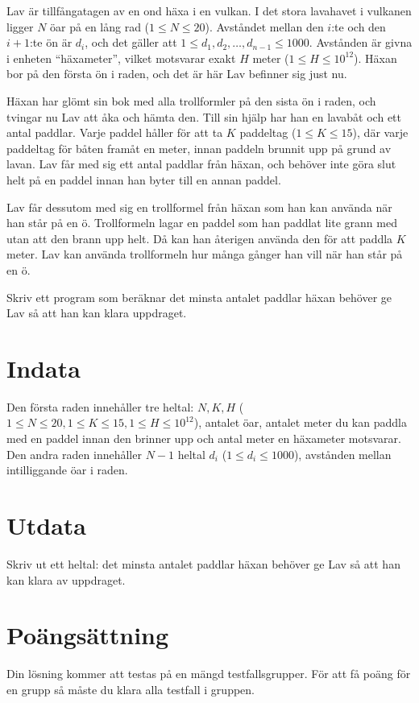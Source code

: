 Lav är tillfångatagen av en ond häxa i en vulkan. I det stora lavahavet i vulkanen ligger $N$ öar på en lång rad ($1 \le N \le 20$).
Avståndet mellan den $i$:te och den $i+1$:te ön är $d_i$, och det gäller att $1 \le d_1, d_2, \dots, d_{n-1} \le 1000$. Avstånden är givna i enheten ``häxameter'', vilket motsvarar exakt $H$ meter ($1 \le H \le 10^{12}$). Häxan bor på den första ön i raden, och det är här Lav befinner sig just nu.

Häxan har glömt sin bok med alla trollformler på den sista ön i raden, och tvingar nu Lav att åka och hämta den. Till sin hjälp har han en lavabåt och ett antal paddlar. 
Varje paddel håller för att ta $K$ paddeltag ($1 \le K \le 15$), där varje paddeltag för båten framåt en meter, innan paddeln brunnit upp på grund av lavan.
Lav får med sig ett antal paddlar från häxan, och behöver inte göra slut helt på en paddel innan han byter till en annan paddel.

Lav får dessutom med sig en trollformel från häxan som han kan använda när han står på en ö. Trollformeln lagar en paddel som han paddlat lite grann med utan att den brann upp helt.
Då kan han återigen använda den för att paddla $K$ meter. Lav kan använda trollformeln hur många gånger han vill när han står på en ö.

Skriv ett program som beräknar det minsta antalet paddlar häxan behöver ge Lav så att han kan klara uppdraget.

\section*{Indata}
Den första raden innehåller tre heltal: $N, K, H$ ($1 \leq N \leq 20, 1 \leq K \leq 15, 1 \leq H \leq 10^{12}$), antalet öar, antalet meter du kan paddla med en paddel innan den brinner upp och antal meter en häxameter motsvarar.
Den andra raden innehåller $N-1$ heltal $d_i$ ($1 \leq d_i \leq 1000$), avstånden mellan intilliggande öar i raden.

\section*{Utdata}
Skriv ut ett heltal: det minsta antalet paddlar häxan behöver ge Lav så att han kan klara av uppdraget.

\section*{Poängsättning}
Din lösning kommer att testas på en mängd testfallsgrupper.
För att få poäng för en grupp så måste du klara alla testfall i gruppen.

